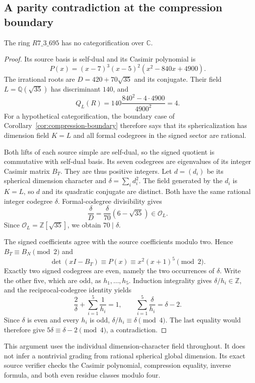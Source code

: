 \subsection{A parity contradiction at the compression boundary}
\label{subsec:r695-general}

\begin{proposition}\label{prop:r695-general}
The ring $R7\_3\_695$ has no categorification over $\mathbb C$.
\end{proposition}
\begin{proof}
Its source basis is self-dual and its Casimir polynomial is
\[
 P(x)=(x-7)^3(x-5)^2(x^2-840x+4900).
\]
The irrational roots are $D=420+70\sqrt{35}$ and its conjugate.
Their field $L=\mathbb Q(\sqrt{35})$ has discriminant $140$, and
\[
 Q_L(R)=140\frac{840^2-4\cdot4900}{4900^2}=4.
\]
For a hypothetical categorification, the boundary case of
Corollary~\ref{cor:compression-boundary} therefore says that its
sphericalization has dimension field $K=L$ and all formal codegrees
in the signed sector are rational.

Both lifts of each source simple are self-dual, so the signed quotient
is commutative with self-dual basis. Its seven codegrees are eigenvalues
of its integer Casimir matrix $B_T$. They are thus positive integers.
Let $d=(d_i)$ be its spherical dimension character and
$\delta=\sum_i d_i^2$. The field generated by the $d_i$ is $K=L$,
so $d$ and its quadratic conjugate are distinct. Both have the same
rational integer codegree $\delta$. Formal-codegree divisibility gives
\[
 \frac\delta D=\frac\delta{70}(6-\sqrt{35})\in\mathcal O_L.
\]
Since $\mathcal O_L=\mathbb Z[\sqrt{35}]$, we obtain $70\mid\delta$.

The signed coefficients agree with the source coefficients modulo two.
Hence $B_T\equiv B_N\pmod2$ and
\[
 \det(xI-B_T)\equiv P(x)\equiv x^2(x+1)^5\pmod2.
\]
Exactly two signed codegrees are even, namely the two occurrences of
$\delta$. Write the other five, which are odd, as $h_1,\ldots,h_5$.
Induction integrality gives $\delta/h_i\in\mathbb Z$, and the
reciprocal-codegree identity yields
\[
 \frac2\delta+\sum_{i=1}^5\frac1{h_i}=1,
 \qquad \sum_{i=1}^5\frac\delta{h_i}=\delta-2.
\]
Since $\delta$ is even and every $h_i$ is odd,
$\delta/h_i\equiv\delta\pmod4$. The last equality would therefore
give $5\delta\equiv\delta-2\pmod4$, a contradiction.
\end{proof}

This argument uses the individual dimension-character field throughout.
It does not infer a nontrivial grading from rational spherical global
dimension. Its exact source verifier checks the Casimir polynomial,
compression equality, inverse formula, and both even residue classes
modulo four.
